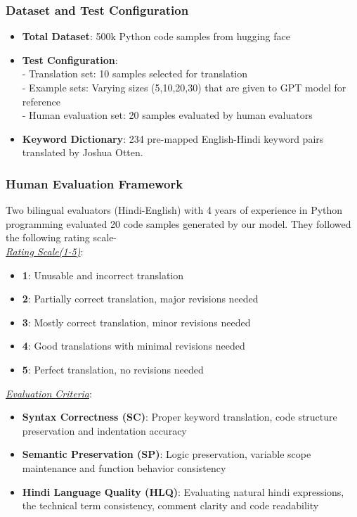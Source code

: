 \documentclass[11pt,a4paper]{article}
\begin{document}
\subsubsection{Dataset and Test Configuration}
\begin{itemize}[itemsep=0pt, topsep=0pt]
    \item \textbf{Total Dataset}: 500k Python code samples from hugging face \cite{jtatman2021python}
    \item \textbf{Test Configuration}:\\ 
    - Translation set: 10 samples selected for translation\\
    - Example sets: Varying sizes (5,10,20,30) that are given to GPT model for reference\\ 
    - Human evaluation set: 20 samples evaluated by human evaluators
    \item \textbf{Keyword Dictionary}: 234 pre-mapped English-Hindi keyword pairs translated by Joshua Otten.
\end{itemize}
\subsubsection{Human Evaluation Framework}
Two bilingual evaluators (Hindi-English) with 4 years of experience in Python programming evaluated 20 code samples generated by our model. They followed the following rating scale-\\ 
\textit{\underline{Rating Scale(1-5)}}:
\begin{itemize}[itemsep=0pt, topsep=0pt]
    \item \textbf{1}: Unusable and incorrect translation
    \item \textbf{2}: Partially correct translation, major revisions needed
    \item \textbf{3}: Mostly correct translation, minor revisions needed
    \item \textbf{4}: Good translations with minimal revisions needed
    \item \textbf{5}: Perfect translation, no revisions needed
\end{itemize}
\textit{\underline{Evaluation Criteria}}:
\begin{itemize}[itemsep=0pt, topsep=0pt]
    \item \textbf{Syntax Correctness (SC)}: Proper keyword translation, code structure preservation and indentation accuracy
    \item \textbf{Semantic Preservation (SP)}: Logic preservation, variable scope maintenance and function behavior consistency
    \item \textbf{Hindi Language Quality (HLQ)}: Evaluating natural hindi expressions, the technical term consistency, comment clarity and code readability
\end{itemize}
\end{document}
